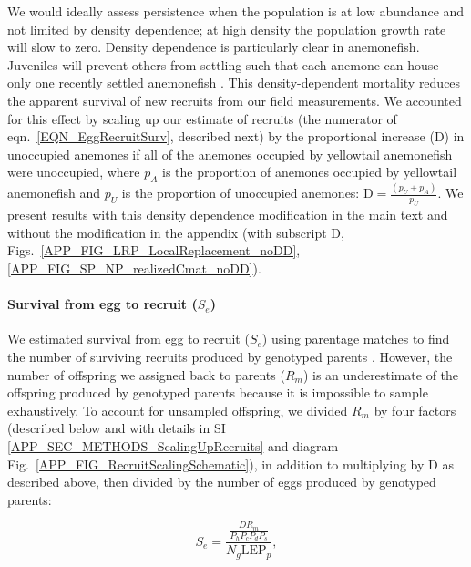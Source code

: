 \documentclass[12pt, oneside]{article}   	%
\begin{document}
We would ideally assess persistence when the population is at low abundance and not limited by density dependence; at high density the population growth rate will slow to zero. Density dependence is particularly clear in anemonefish. Juveniles will prevent others from settling such that each anemone can house only one recently settled anemonefish \citep{buston2003forcible}. This density-dependent mortality reduces the apparent survival of new recruits from our field measurements. We accounted for this effect by scaling up our estimate of recruits (the numerator of eqn.\ \ref{EQN_EggRecruitSurv}, described next) by the proportional increase ($\text{D}$) in unoccupied anemones if all of the anemones occupied by yellowtail anemonefish were unoccupied, where $p_A$ is the proportion of anemones occupied by yellowtail anemonefish and $p_U$ is the proportion of unoccupied anemones: $\text{D} = \frac{(p_U + p_A)}{p_U}$. We present results with this density dependence modification in the main text and without the modification in the appendix (with subscript D, Figs.\ \ref{APP_FIG_LRP_LocalReplacement_noDD}, \ref{APP_FIG_SP_NP_realizedCmat_noDD}). %

\paragraph*{Survival from egg to recruit ($S_e$)}

We estimated survival from egg to recruit ($S_e$) using parentage matches to find the number of surviving recruits produced by genotyped parents \citep[similar to][]{johnson2018integrating}. However, the number of offspring we assigned back to parents ($R_m$) is an underestimate of the offspring produced by genotyped parents because it is impossible to sample exhaustively. To account for unsampled offspring, we divided $R_m$ by four factors (described below and with details in SI \ref{APP_SEC_METHODS_ScalingUpRecruits} and diagram Fig.\ \ref{APP_FIG_RecruitScalingSchematic}), in addition to multiplying by $\text{D}$ as described above, then divided by the number of eggs produced by genotyped parents:

\begin{equation}
S_e = \frac{\frac{D R_m}{P_h P_c P_d P_s}}{N_g \text{LEP}_p}, \label{EQN_EggRecruitSurv}
\end{equation}
\end{document}

